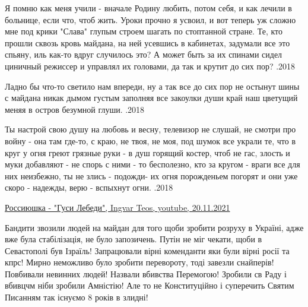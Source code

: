 \begin{itemize}
\begin{multicols}{2}
\obeycr
Я помню как меня учили -
вначале Родину любить,
потом себя, и как лечили
в больнице, если что, чтоб жить.
\smallskip
Уроки прочно я усвоил,
и вот теперь уж сложно мне
под крики "Слава" глупым строем
шагать по стоптанной стране.
\columnbreak
Те, кто прошли сквозь кровь майдана,
на ней усевшись в кабинетах,
задумали все это спьяну,
иль как-то вдруг случилось это?
\smallskip
А может быть за их спинами
сидел циничный режиссер
и управлял их головами,
да так и крутит до сих пор?
.2018
\restorecr
\end{multicols}


\begin{multicols}{2}
\obeycr
Ладно бы что-то светило
нам впереди, ну а так
все до сих пор не остынут
шины с майдана никак
\smallskip
дымом густым заполняя
все закоулки души
край наш цветущий меняя
в остров безумной глуши.
.2018
\restorecr
\end{multicols}


\begin{multicols}{2}
\obeycr
Ты настрой свою душу
на любовь и весну,
телевизор не слушай,
не смотри про войну -
\smallskip
она там где-то, с краю,
не твоя, не моя,
под шумок все украли
те, что в круг у огня
\smallskip
греют грязные руки -
в душ горящий костер,
чтоб не гас, злость и муки
добавляют - не спорь
\smallskip
с ними - то бесполезно,
кто за кругом - враги
все для них неизбежно,
ты не злись - подожди-
\smallskip
их огня порожденьем
погорят и они
уже скоро - надежды,
верю - вспыхнут огни.
.2018
\restorecr
\end{multicols}


\href{https://www.youtube.com/watch?v=tegjASN0FvU}{%
Россиюшка - "Гуси Лебеди", Ingvar Teos, youtube, 20.11.2021%
}


Бандити звозили людей на майдан для того щоби зробити розруху в Україні, адже
вже була стабілізація, не було запозичень. Путін не міг чекати, щоби в
Севастополі був Ізраїль! Запрацювали вірні коменданти яки були вірні росії та
кпрс! Мирно неможливо було зробити перевороту, тоді завезли снайперів!
Повбивали невинних людей! Назвали вбивства Перемогою! Зробили св Раду і вбивцчм
ніби зробили Амністію! Але то не Конституційно і суперечить Святим Писанням так
існуємо 8 років в злидні!



\end{itemize}
